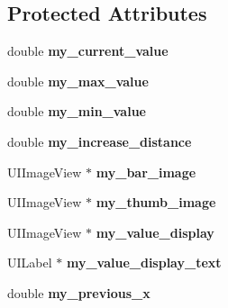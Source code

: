 \subsection*{\-Protected \-Attributes}
\begin{DoxyCompactItemize}
\item 
\hypertarget{interface_a_s_s_lider_ac90d1f5bfc85265165a3691b8a31745a}{
double {\bfseries my\-\_\-current\-\_\-value}}
\label{interface_a_s_s_lider_ac90d1f5bfc85265165a3691b8a31745a}

\item 
\hypertarget{interface_a_s_s_lider_a83873a0c961334efce904d2f186b2889}{
double {\bfseries my\-\_\-max\-\_\-value}}
\label{interface_a_s_s_lider_a83873a0c961334efce904d2f186b2889}

\item 
\hypertarget{interface_a_s_s_lider_a9b4e1c8c911bf5298a45c05417523fb7}{
double {\bfseries my\-\_\-min\-\_\-value}}
\label{interface_a_s_s_lider_a9b4e1c8c911bf5298a45c05417523fb7}

\item 
\hypertarget{interface_a_s_s_lider_a6e25f49efacd9df643cafd9aec8f7ea9}{
double {\bfseries my\-\_\-increase\-\_\-distance}}
\label{interface_a_s_s_lider_a6e25f49efacd9df643cafd9aec8f7ea9}

\item 
\hypertarget{interface_a_s_s_lider_ae8ef1b932f3fb085a1b56230162edfc2}{
\-U\-I\-Image\-View $\ast$ {\bfseries my\-\_\-bar\-\_\-image}}
\label{interface_a_s_s_lider_ae8ef1b932f3fb085a1b56230162edfc2}

\item 
\hypertarget{interface_a_s_s_lider_acf30e04fd2043df00b4181f5ef7b792e}{
\-U\-I\-Image\-View $\ast$ {\bfseries my\-\_\-thumb\-\_\-image}}
\label{interface_a_s_s_lider_acf30e04fd2043df00b4181f5ef7b792e}

\item 
\hypertarget{interface_a_s_s_lider_af2af97f3cd07baf0b06b437e181cabf3}{
\-U\-I\-Image\-View $\ast$ {\bfseries my\-\_\-value\-\_\-display}}
\label{interface_a_s_s_lider_af2af97f3cd07baf0b06b437e181cabf3}

\item 
\hypertarget{interface_a_s_s_lider_ab45d55f2decf229cba867e087eb0e047}{
\-U\-I\-Label $\ast$ {\bfseries my\-\_\-value\-\_\-display\-\_\-text}}
\label{interface_a_s_s_lider_ab45d55f2decf229cba867e087eb0e047}

\item 
\hypertarget{interface_a_s_s_lider_ad02735af2f9598eceaffc6fe17ea81b8}{
double {\bfseries my\-\_\-previous\-\_\-x}}
\label{interface_a_s_s_lider_ad02735af2f9598eceaffc6fe17ea81b8}

\end{DoxyCompactItemize}
